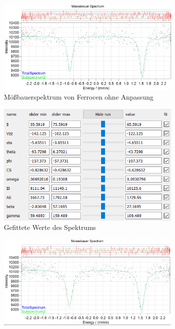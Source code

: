 \documentclass[german, %
parskip=full, %
bibliography=totoc, %
]{scrartcl}
\begin{document}
\begin{figure}[ht]
	\centering
	\begin{subfigure}[b]{0.5\textwidth}
		\includegraphics[width=\textwidth]{MoessbauerFerrocenoA}
	  \caption{Mößbauerspektrum von Ferrocen ohne Anpassung}
	  \label{fig:moessferrocenoA}
  \end{subfigure}
  \begin{subfigure}[b]{0.4\textwidth}
	  \includegraphics[width=\textwidth]{WerteFerrocenoA}
	  \caption{Gefittete Werte des Spektrums}
	  \label{fig:werteferrocenoA}
  \end{subfigure}
	\begin{subfigure}[b]{0.5\textwidth}
		\includegraphics[width=\textwidth]{MoessbauerFerrocen}

\end{subfigure}
\end{figure}
\end{document}
